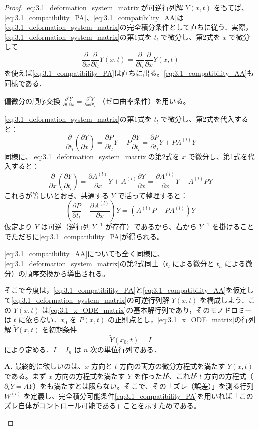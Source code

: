 \begin{proof}
\eqref{eq:3.1_deformation_system_matrix}が可逆行列解 $Y(x,t)$ をもてば、\eqref{eq:3.1_compatibility_PA}、\eqref{eq:3.1_compatibility_AA}は\eqref{eq:3.1_deformation_system_matrix}の完全積分条件として直ちに従う．実際，\eqref{eq:3.1_deformation_system_matrix}の第1式を $t_l$ で微分し、第2式を $x$ で微分して
\[
  \frac{\partial}{\partial x}\frac{\partial}{\partial t_l}Y(x,t) = \frac{\partial}{\partial t_l}\frac{\partial}{\partial x}Y(x,t)
\]
を使えば\eqref{eq:3.1_compatibility_PA}は直ちに出る。\eqref{eq:3.1_compatibility_AA}も同様である．

偏微分の順序交換 $\frac{\partial^2 Y}{\partial t_l \partial x} = \frac{\partial^2 Y}{\partial x \partial t_l}$ （ゼロ曲率条件）を用いる。

\eqref{eq:3.1_deformation_system_matrix}の第1式を $t_l$ で微分し、第2式を代入すると：
\[
  \frac{\partial}{\partial t_l}\left(\frac{\partial Y}{\partial x}\right) 
  = \frac{\partial P}{\partial t_l}Y + P\frac{\partial Y}{\partial t_l} 
  = \frac{\partial P}{\partial t_l}Y + P A^{(l)}Y
\]
同様に、\eqref{eq:3.1_deformation_system_matrix}の第2式を $x$ で微分し、第1式を代入すると：
\[
  \frac{\partial}{\partial x}\left(\frac{\partial Y}{\partial t_l}\right) 
  = \frac{\partial A^{(l)}}{\partial x}Y + A^{(l)}\frac{\partial Y}{\partial x} 
  = \frac{\partial A^{(l)}}{\partial x}Y + A^{(l)} P Y
\]
これらが等しいとおき、共通する $Y$ で括って整理すると：
\[
  \left( \frac{\partial P}{\partial t_l} - \frac{\partial A^{(l)}}{\partial x} \right) Y 
  = \left( A^{(l)} P - P A^{(l)} \right) Y
\]
仮定より $Y$ は可逆（逆行列 $Y^{-1}$ が存在）であるから、右から $Y^{-1}$ を掛けることでただちに\eqref{eq:3.1_compatibility_PA}が得られる。

\eqref{eq:3.1_compatibility_AA}についても全く同様に、\eqref{eq:3.1_deformation_system_matrix}の第2式同士（$t_l$ による微分と $t_h$ による微分）の順序交換から導出される。

そこで今度は，\eqref{eq:3.1_compatibility_PA}と\eqref{eq:3.1_compatibility_AA}を仮定して\eqref{eq:3.1_deformation_system_matrix}の可逆行列解 $Y(x,t)$ を構成しよう．この $Y(x,t)$ は\eqref{eq:3.1_x_ODE_matrix}の基本解行列であり，そのモノドロミーは $t$ に依らない．$x_0$ を $P(x,t)$ の正則点とし，\eqref{eq:3.1_x_ODE_matrix}の行列解 $\tilde{Y}(x,t)$ を初期条件
\[
  \tilde{Y}(x_0,t) = I
\]
により定める．$I=I_n$ は $n$ 次の単位行列である．

\begin{Q}
\textbf{A.} 最終的に欲しいのは、$x$ 方向と $t$ 方向の両方の微分方程式を満たす $Y(x,t)$ である。まず $x$ 方向の方程式を満たす $\tilde{Y}$ を作ったが、これが $t$ 方向の方程式（$\partial_t \tilde{Y} = A\tilde{Y}$）をも満たすとは限らない。そこで、その「ズレ（誤差）」を測る行列 $W^{(l)}$ を定義し、完全積分可能条件\eqref{eq:3.1_compatibility_PA}を用いれば「このズレ自体がコントロール可能である」ことを示すためである。
\end{Q}


\end{proof}
